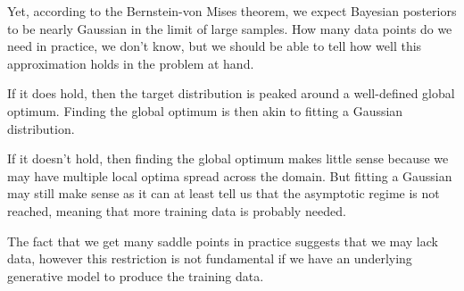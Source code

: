 \documentclass{article}
\begin{document}
Yet, according to the Bernstein-von Mises theorem, we expect Bayesian posteriors to be nearly Gaussian in the limit of large samples. How many data points do we need in practice, we don't know, but we should be able to tell how well this approximation holds in the problem at hand.

If it does hold, then the target distribution is peaked around a well-defined global optimum. Finding the global optimum is then akin to fitting a Gaussian distribution. 

If it doesn't hold, then finding the global optimum makes little sense because we may have multiple local optima spread across the domain. But fitting a Gaussian may still make sense as it can at least tell us that the asymptotic regime is not reached, meaning that more training data is probably needed.

The fact that we get many saddle points in practice suggests that we may lack data, however this restriction is not fundamental if we have an underlying generative model to produce the training data. 






\end{document}
